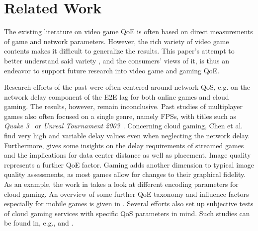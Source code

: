 \section{Related Work}
\label{sec:relatedwork}

The existing literature on video game \gls{QoE} is often based on
direct measurements of game and network parameters. However, the
rich variety of video game contents makes it difficult to generalize
the results. This paper's attempt to better understand said variety
, and the consumers' views of it, is thus an endeavor to support future
research into video game and gaming \gls{QoE}.

Research efforts of the past were often centered around network \acrshort{QoS}, e.g. on the network delay component of the \gls{E2E} lag for both online games and cloud gaming. The results, however, remain inconclusive. Past studies of multiplayer games also often focused on a single genre, namely \glspl{FPS}, with titles such as \textit{Quake 3}~\cite{1266180} or \textit{Unreal Tournament 2003}~\cite{Beigbeder:2004:ELL:1016540.1016556}. Concerning cloud gaming, Chen et al.~\cite{6670099} find very high and variable delay values even when neglecting the network delay. Furthermore, \cite{Choy:2012:BSC:2501560.2501563} gives some insights on the delay requirements of streamed games and the implications for data center distance as well as placement.
Image quality represents a further \gls{QoE} factor. Gaming adds
another dimension to typical image quality assessments, as most
games allow for changes to their graphical fidelity.
As an example, the work in \cite{slivarimpact} takes a look at different encoding parameters for cloud gaming.%
An overview of some further \gls{QoE} taxonomy and influence factors especially for mobile games is given in \cite{beyer2014typedisplaydelayimpact}. Several efforts also set up subjective tests of cloud gaming services with specific \gls{QoS} parameters in mind. Such studies can be found in, e.g., \cite{Jarschel20132883} and  \cite{6614351}.

